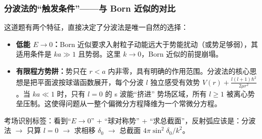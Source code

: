 \begin{derivationbox}[为什么这道题必须用分波法？]
\subsubsection*{分波法的``触发条件''——与 Born 近似的对比}

这道题有两个特征，直接决定了分波法是唯一自然的选择：
\begin{itemize}
    \item \textbf{低能 $E \to 0$：}Born 近似要求入射粒子动能远大于势能扰动（或势足够弱），其适用条件是 $ka \gg 1$ 且势弱。这里 $k \to 0$，Born 近似的前提崩塌。
    \item \textbf{有限程方势阱：}势只在 $r < a$ 内非零，具有明确的作用范围。分波法的核心思想是把平面波按球谐函数展开，每个分波 $l$ 独立感受有效势 $V(r) + \frac{l(l+1)\hbar^2}{2\mu r^2}$。当 $ka \ll 1$ 时，只有 $l = 0$ 的 s 波能``挤进'' 势场区域，所有 $l \ge 1$ 被离心势垒压制。这使得问题从一整个偏微分方程降维为一个常微分方程。
\end{itemize}

考场识别标签：看到``$E \to 0$'' + ``球对称势'' + ``求总截面''，反射弧应该是：分波法 $\to$ 只算 $l = 0$ $\to$ 求相移 $\delta_0$ $\to$ 总截面 $4\pi\sin^2\delta_0/k^2$。
\end{derivationbox}

